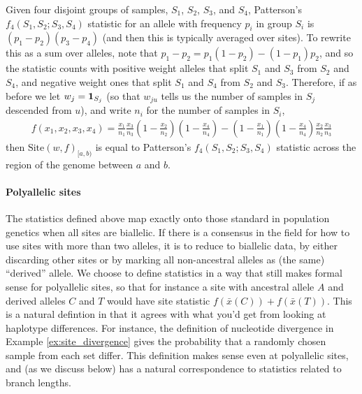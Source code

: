 \documentclass{article}
\newcommand{\site}{\mbox{Site}} %
\newcommand{\iw}{w} %
\newcommand{\aw}{{\bar x}} %
\begin{document}
\begin{example}[Patterson's $f_4$] \label{ex:site_f4}
    Given four disjoint groups of samples, $S_1$, $S_2$, $S_3$, and $S_4$,
    Patterson's $f_4(S_1, S_2; S_3, S_4)$ statistic for an allele with frequency $p_i$ in group $S_i$
    is $(p_1 - p_2)(p_3 - p_4)$ (and then this is typically averaged over sites).
    To rewrite this as a sum over alleles, note that
    $p_1 - p_2 = p_1 (1 - p_2) - (1 - p_1) p_2$,
    and so the statistic counts with positive weight
    alleles that split $S_1$ and $S_3$ from $S_2$ and $S_4$,
    and negative weight ones that split $S_1$ and $S_4$ from $S_2$ and $S_3$.
    Therefore, if as before we
    let $\iw_j = \bone_{S_j}$
    (so that $\iw_{ju}$ tells us the number of samples in $S_j$ descended from $u$),
    and write $n_i$ for the number of samples in $S_i$,
    \begin{align*}
        f(x_1, x_2, x_3, x_4)
        =
        \frac{x_1}{n_1}
        \frac{x_3}{n_3}
        \left(1 - \frac{x_2}{n_2}\right)
        \left(1 - \frac{x_4}{n_4}\right)
        -
        \left(1 - \frac{x_1}{n_1}\right)
        \left(1 - \frac{x_4}{n_4}\right)
        \frac{x_2}{n_2}
        \frac{x_3}{n_3}
    \end{align*}
    then $\site(\iw, f)_{[a,b)}$ is equal to Patterson's $f_4(S_1, S_2; S_3, S_4)$ statistic
    across the region of the genome between $a$ and $b$.
\end{example}

\paragraph{Polyallelic sites}
The statistics defined above map exactly onto those standard in population genetics
when all sites are biallelic.
If there is a consensus in the field
for how to use sites with more than two alleles,
it is to reduce to biallelic data, by either discarding other sites
or by marking all non-ancestral alleles as (the same) ``derived'' allele.
We choose to define statistics in a way that still makes formal sense for polyallelic sites,
so that for instance a site with ancestral allele $A$ and derived alleles $C$ and $T$
would have site statistic $f(\aw(C)) + f(\aw(T))$.
This is a natural defintion in that it agrees with what you'd get
from looking at haplotype differences.
For instance, the definition of nucleotide divergence in Example \ref{ex:site_divergence}
gives the probability that a randomly chosen sample from each set differ.
This definition makes sense even at polyallelic sites,
and (as we discuss below) has a natural correspondence to statistics related to branch lengths.
\end{document}
